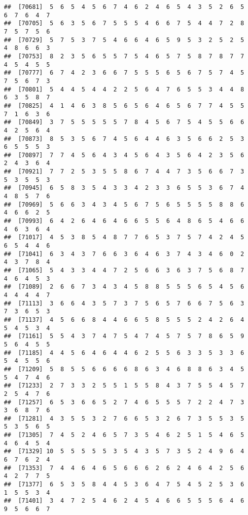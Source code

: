 \documentclass[
]{book}
\begin{document}
\begin{verbatim}
##  [70681]  5  6  5  4  5  6  7  4  6  2  4  6  5  4  3  5  2  6  5  6  7  6  4  7
##  [70705]  5  6  3  5  6  7  5  5  5  4  6  6  7  5  4  4  7  2  8  7  5  7  5  6
##  [70729]  5  7  5  3  7  5  4  6  6  4  6  5  9  5  3  2  5  2  5  4  8  6  6  3
##  [70753]  8  2  3  5  6  5  5  7  5  4  6  5  7  5  8  7  8  7  7  4  5  4  5  5
##  [70777]  6  7  4  2  3  6  6  7  5  5  5  6  5  6  7  5  7  4  5  7  5  6  7  3
##  [70801]  5  4  4  5  4  4  2  2  5  6  4  7  6  5  5  3  4  4  8  6  3  5  8  7
##  [70825]  4  1  4  6  3  8  5  6  5  6  4  6  5  6  7  7  4  5  5  7  1  6  3  6
##  [70849]  3  7  5  5  5  5  5  7  8  4  5  6  7  5  4  5  5  6  6  4  2  5  6  4
##  [70873]  8  5  3  5  6  7  4  5  6  4  4  6  3  5  6  6  2  5  3  6  5  5  5  3
##  [70897]  7  7  4  5  6  4  3  4  5  6  4  3  5  6  4  2  3  5  6  2  4  3  6  4
##  [70921]  7  7  2  5  3  5  5  8  6  7  4  4  7  3  5  6  6  7  3  5  3  5  5  3
##  [70945]  6  5  8  3  5  4  3  3  4  2  3  3  6  5  5  3  6  7  4  4  8  5  7  6
##  [70969]  5  6  6  3  4  3  4  5  6  7  5  6  5  5  5  5  8  8  6  4  6  6  2  5
##  [70993]  6  4  2  6  4  6  4  6  6  5  5  6  4  8  6  5  4  6  6  4  6  3  6  4
##  [71017]  4  5  3  8  5  4  8  7  7  6  5  3  7  5  7  4  2  4  5  6  5  4  4  6
##  [71041]  6  3  4  3  7  6  6  3  6  4  6  3  7  4  3  4  6  0  2  4  3  7  8  4
##  [71065]  5  4  3  3  4  4  7  2  5  6  6  3  6  3  7  5  6  8  7  4  6  4  5  3
##  [71089]  2  6  6  7  3  4  3  4  5  8  8  5  5  5  6  5  4  5  6  4  4  4  4  7
##  [71113]  3  6  6  4  3  5  7  3  7  5  6  5  7  6  6  7  5  6  3  7  3  6  5  3
##  [71137]  4  5  6  6  8  4  4  6  6  5  8  5  5  5  2  4  2  6  4  5  4  5  3  4
##  [71161]  5  5  4  3  7  4  7  5  4  7  4  5  7  5  7  8  6  5  9  5  6  4  5  5
##  [71185]  4  4  5  6  4  6  4  4  6  2  5  5  6  3  3  5  3  3  6  5  4  5  5  6
##  [71209]  5  8  5  5  6  6  6  6  8  6  3  4  6  8  8  6  3  4  5  5  4  7  4  6
##  [71233]  2  7  3  3  2  5  5  1  5  5  8  4  3  7  5  5  4  5  7  2  5  4  7  6
##  [71257]  6  5  3  6  6  5  2  7  4  6  5  5  5  7  2  2  4  7  3  3  6  8  7  6
##  [71281]  4  3  5  5  3  2  7  6  6  5  3  2  6  7  3  5  5  3  5  5  3  5  6  5
##  [71305]  7  4  5  2  4  6  5  7  3  5  4  6  2  5  1  5  4  6  5  4  6  4  5  4
##  [71329] 10  5  5  5  5  5  3  5  4  3  5  7  3  5  2  4  9  6  4  6  7  6  2  4
##  [71353]  7  4  4  6  4  6  5  6  6  6  2  6  2  4  6  4  2  5  6  4  2  7  7  5
##  [71377]  6  5  3  5  8  4  4  5  3  6  4  7  5  4  5  2  5  3  6  1  5  5  3  4
##  [71401]  3  4  7  2  5  4  6  2  4  5  4  6  6  5  5  5  6  4  6  9  5  6  6  7

\end{verbatim}
\end{document}
